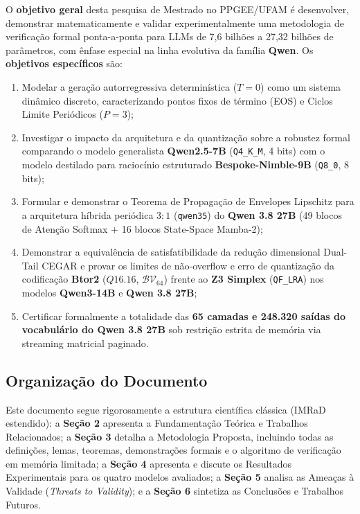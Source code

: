 \documentclass[11pt,a4paper]{article}
\theoremstyle{definition}
\begin{document}
O \textbf{objetivo geral} desta pesquisa de Mestrado no PPGEE/UFAM é desenvolver, demonstrar matematicamente e validar experimentalmente uma metodologia de verificação formal ponta-a-ponta para LLMs de 7,6 bilhões a 27,32 bilhões de parâmetros, com ênfase especial na linha evolutiva da família \textbf{Qwen}. Os \textbf{objetivos específicos} são:
\begin{enumerate}
    \item Modelar a geração autorregressiva determinística ($T=0$) como um sistema dinâmico discreto, caracterizando pontos fixos de término (EOS) e Ciclos Limite Periódicos ($P=3$);
    \item Investigar o impacto da arquitetura e da quantização sobre a robustez formal comparando o modelo generalista \textbf{Qwen2.5-7B} (\texttt{Q4\_K\_M}, 4 bits) com o modelo destilado para raciocínio estruturado \textbf{Bespoke-Nimble-9B} (\texttt{Q8\_0}, 8 bits);
    \item Formular e demonstrar o Teorema de Propagação de Envelopes Lipschitz para a arquitetura híbrida periódica $3:1$ (\texttt{qwen35}) do \textbf{Qwen 3.8 27B} (49 blocos de Atenção Softmax + 16 blocos State-Space Mamba-2);
    \item Demonstrar a equivalência de satisfatibilidade da redução dimensional Dual-Tail CEGAR e provar os limites de não-overflow e erro de quantização da codificação \textbf{Btor2} ($Q16.16$, $\mathcal{BV}_{64}$) frente ao \textbf{Z3 Simplex} (\texttt{QF\_LRA}) nos modelos \textbf{Qwen3-14B} e \textbf{Qwen 3.8 27B};
    \item Certificar formalmente a totalidade das \textbf{65 camadas e 248.320 saídas do vocabulário do Qwen 3.8 27B} sob restrição estrita de memória via streaming matricial paginado.
\end{enumerate}

\subsection{Organização do Documento}

Este documento segue rigorosamente a estrutura científica clássica (IMRaD estendido): a \textbf{Seção 2} apresenta a Fundamentação Teórica e Trabalhos Relacionados; a \textbf{Seção 3} detalha a Metodologia Proposta, incluindo todas as definições, lemas, teoremas, demonstrações formais e o algoritmo de verificação em memória limitada; a \textbf{Seção 4} apresenta e discute os Resultados Experimentais para os quatro modelos avaliados; a \textbf{Seção 5} analisa as Ameaças à Validade (\textit{Threats to Validity}); e a \textbf{Seção 6} sintetiza as Conclusões e Trabalhos Futuros.
\end{document}
